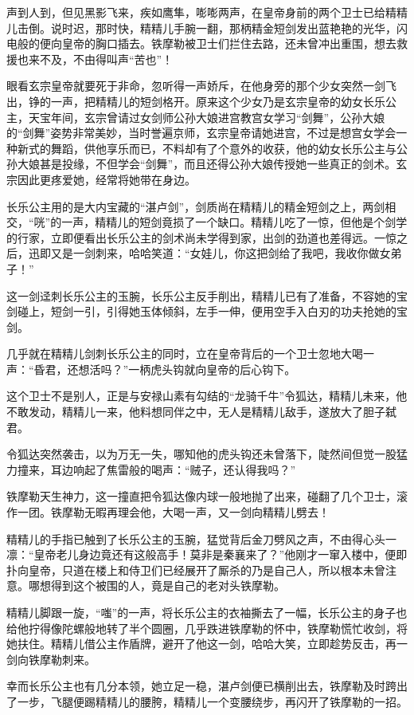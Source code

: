 \documentclass[12pt,oneside]{book}
\begin{document}
声到人到，但见黑影飞来，疾如鹰隼，嘭嘭两声，在皇帝身前的两个卫士已给精精儿击倒。说时迟，那时快，精精儿手腕一翻，那柄精金短剑发出蓝艳艳的光华，闪电般的便向皇帝的胸口插去。铁摩勒被卫士们拦住去路，还未曾冲出重围，想去救援也来不及，不由得叫声``苦也''！

眼看玄宗皇帝就要死于非命，忽听得一声娇斥，在他身旁的那个少女突然一剑飞出，铮的一声，把精精儿的短剑格开。原来这个少女乃是玄宗皇帝的幼女长乐公主，天宝年间，玄宗曾请过女剑师公孙大娘进宫教宫女学习``剑舞''，公孙大娘的``剑舞''姿势非常美妙，当时誉遍京师，玄宗皇帝请她进宫，不过是想宫女学会一种新式的舞蹈，供他享乐而已，不料却有了个意外的收获，他的幼女长乐公主与公孙大娘甚是投缘，不但学会``剑舞''，而且还得公孙大娘传授她一些真正的剑术。玄宗因此更疼爱她，经常将她带在身边。

长乐公主用的是大内宝藏的``湛卢剑''，剑质尚在精精儿的精金短剑之上，两剑相交，``咣''的一声，精精儿的短剑竟损了一个缺口。精精儿吃了一惊，但他是个剑学的行家，立即便看出长乐公主的剑术尚未学得到家，出剑的劲道也差得远。一惊之后，迅即又是一剑刺来，哈哈笑道：``女娃儿，你这把剑给了我吧，我收你做女弟子！''

这一剑迳刺长乐公主的玉腕，长乐公主反手削出，精精儿已有了准备，不容她的宝剑碰上，短剑一引，引得她玉体倾斜，左手一伸，便用空手入白刃的功夫抢她的宝剑。

几乎就在精精儿剑刺长乐公主的同时，立在皇帝背后的一个卫士忽地大喝一声：``昏君，还想活吗？''一柄虎头钩就向皇帝的后心钩下。

这个卫士不是别人，正是与安禄山素有勾结的``龙骑千牛''令狐达，精精儿未来，他不敢发动，精精儿一来，他料想同伴之中，无人是精精儿敌手，遂放大了胆子弑君。

令狐达突然袭击，以为万无一失，哪知他的虎头钩还未曾落下，陡然间但觉一股猛力撞来，耳边响起了焦雷般的喝声：``贼子，还认得我吗？''

铁摩勒天生神力，这一撞直把令狐达像内球一般地抛了出来，碰翻了几个卫士，滚作一团。铁摩勒无暇再理会他，大喝一声，又一剑向精精儿劈去！

精精儿的手指已触到了长乐公主的玉腕，猛觉背后金刀劈风之声，不由得心头一凛：``皇帝老儿身边竟还有这般高手！莫非是秦襄来了？''他刚才一窜入楼中，便即扑向皇帝，只道在楼上和侍卫们已经展开了厮杀的乃是自己人，所以根本未曾注意。哪想得到这个被围的人，竟是自己的老对头铁摩勒。

精精儿脚跟一旋，``嗤''的一声，将长乐公主的衣袖撕去了一幅，长乐公主的身子也给他拧得像陀螺般地转了半个圆圈，几乎跌进铁摩勒的怀中，铁摩勒慌忙收剑，将她扶住。精精儿借公主作盾牌，避开了他这一剑，哈哈大笑，立即趁势反击，再一剑向铁摩勒刺来。

幸而长乐公主也有几分本领，她立足一稳，湛卢剑便已横削出去，铁摩勒及时跨出了一步，飞腿便踢精精儿的腰胯，精精儿一个变腰绕步，再闪开了铁摩勒的一招。
\end{document}
